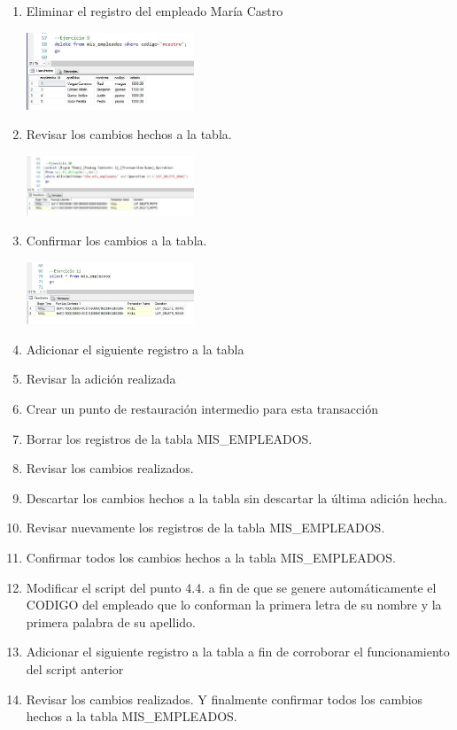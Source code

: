 \begin{enumerate}[1.]
\begin{center}
	\end{center}
	\item Eliminar el registro del empleado María Castro
	\begin{center}
	\includegraphics[width=5cm]{./Imagenes/img9} 
	\end{center}
	\item Revisar los cambios hechos a la tabla.
	\begin{center}
	\includegraphics[width=5cm]{./Imagenes/img10} 
	\end{center}
	\item Confirmar los cambios a la tabla.
	\begin{center}
	\includegraphics[width=5cm]{./Imagenes/img11} 
	\end{center}
	\item Adicionar el siguiente registro a la tabla
	\item Revisar la adición realizada
	\item Crear un punto de restauración intermedio para esta transacción
	\item Borrar los registros de la tabla MIS\_EMPLEADOS.
	\item Revisar los cambios realizados.
	\item Descartar los cambios hechos a la tabla sin descartar la última adición hecha.
	\item Revisar nuevamente los registros de la tabla MIS\_EMPLEADOS.
	\item Confirmar todos los cambios hechos a la tabla MIS\_EMPLEADOS.
	\item Modificar el script del punto 4.4. a fin de que se genere automáticamente el CODIGO del empleado que lo conforman la primera letra de su nombre y la primera palabra de su apellido.
	\item Adicionar el siguiente registro a la tabla a fin de corroborar el funcionamiento del script anterior
	\item Revisar los cambios realizados. Y finalmente confirmar todos los cambios hechos a la tabla MIS\_EMPLEADOS.

\end{enumerate} 
